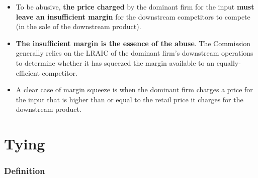             \begin{itemize}
                \item To be abusive, \textbf{the price charged} by the dominant firm for the input \textbf{must leave an insufficient margin} for the downstream competitors to compete (in the sale of the downstream product).
                \item \textbf{The insufficient margin is the essence of the abuse}. The Commission generally relies on the LRAIC of the dominant firm’s downstream operations to determine whether it has squeezed the margin available to an equally-efficient competitor. 
                \item A clear case of margin squeeze is when the dominant firm charges a price for the input that is higher than or equal to the retail price it charges for the downstream product.
            \end{itemize}
      
\section{Tying}

        \subsubsection{Definition}



